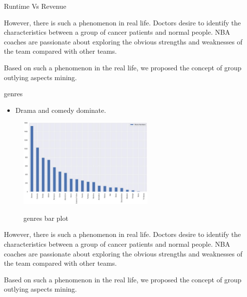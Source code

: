 \documentclass[
 size=12pt,
 paper=smartboard,  %
 mode=present, 		%
 display=slides, 	%
 style=tuliplab,  	%
 pauseslide,
 fleqn,leqno]{powerdot}
\begin{document}
\begin{slide}{Runtime Vs Revenue}
\begin{note}
However,
there is such a phenomenon in real life.
Doctors desire to identify the characteristics between
a group of cancer patients and normal people.
NBA coaches are passionate about exploring the obvious strengths and
weaknesses of the team compared with other teams.

Based on such a phenomenon in the real life,
we proposed the concept of group outlying aspects mining.
\end{note}

\end{slide}

\begin{slide}{genres}
  \begin{itemize}
    \item
    Drama and comedy dominate. 
  \end{itemize}
 \vspace{0.5cm}
  \begin{figure}[htbp]
    \centering
    \includegraphics[width=0.6\textwidth,height=0.45\textwidth]{figures/genres1.eps}\\
    \caption{genres bar plot}
  \end{figure}

\begin{note}
However,
there is such a phenomenon in real life.
Doctors desire to identify the characteristics between
a group of cancer patients and normal people.
NBA coaches are passionate about exploring the obvious strengths and
weaknesses of the team compared with other teams.

Based on such a phenomenon in the real life,
we proposed the concept of group outlying aspects mining.
\end{note}

\end{slide}
\end{document}

